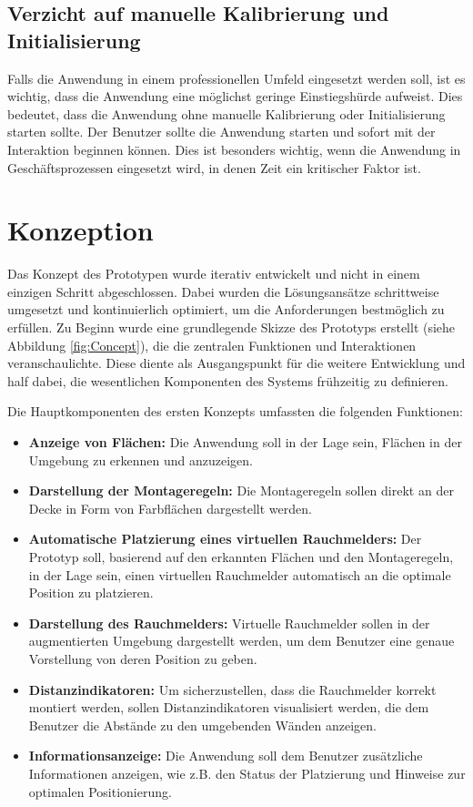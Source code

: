 \subsection{Verzicht auf manuelle Kalibrierung und Initialisierung}

Falls die Anwendung in einem professionellen Umfeld eingesetzt werden soll, ist es wichtig, dass die Anwendung eine möglichst geringe Einstiegshürde aufweist. Dies bedeutet, dass die Anwendung ohne manuelle Kalibrierung oder Initialisierung starten sollte. Der Benutzer sollte die Anwendung starten und sofort mit der Interaktion beginnen können. Dies ist besonders wichtig, wenn die Anwendung in Geschäftsprozessen eingesetzt wird, in denen Zeit ein kritischer Faktor ist.

\section{Konzeption}

Das Konzept des Prototypen wurde iterativ entwickelt und nicht in einem einzigen Schritt abgeschlossen. Dabei wurden die Lösungsansätze schrittweise umgesetzt und kontinuierlich optimiert, um die Anforderungen bestmöglich zu erfüllen. Zu Beginn wurde eine grundlegende Skizze des Prototyps erstellt (siehe Abbildung \ref{fig:Concept}), die die zentralen Funktionen und Interaktionen veranschaulichte. Diese diente als Ausgangspunkt für die weitere Entwicklung und half dabei, die wesentlichen Komponenten des Systems frühzeitig zu definieren.

Die Hauptkomponenten des ersten Konzepts umfassten die folgenden Funktionen:

\begin{itemize}
    \item \textbf{Anzeige von Flächen:} Die Anwendung soll in der Lage sein, Flächen in der Umgebung zu erkennen und anzuzeigen.
    \item \textbf{Darstellung der Montageregeln:} Die Montageregeln sollen direkt an der Decke in Form von Farbflächen dargestellt werden.
    \item \textbf{Automatische Platzierung eines virtuellen Rauchmelders:} Der Prototyp soll, basierend auf den erkannten Flächen und den Montageregeln, in der Lage sein, einen virtuellen Rauchmelder automatisch an die optimale Position zu platzieren.
    \item \textbf{Darstellung des Rauchmelders:} Virtuelle Rauchmelder sollen in der augmentierten Umgebung dargestellt werden, um dem Benutzer eine genaue Vorstellung von deren Position zu geben.
    \item \textbf{Distanzindikatoren:} Um sicherzustellen, dass die Rauchmelder korrekt montiert werden, sollen Distanzindikatoren visualisiert werden, die dem Benutzer die Abstände zu den umgebenden Wänden anzeigen.
    \item \textbf{Informationsanzeige:} Die Anwendung soll dem Benutzer zusätzliche Informationen anzeigen, wie z.B. den Status der Platzierung und Hinweise zur optimalen Positionierung.
\end{itemize}

